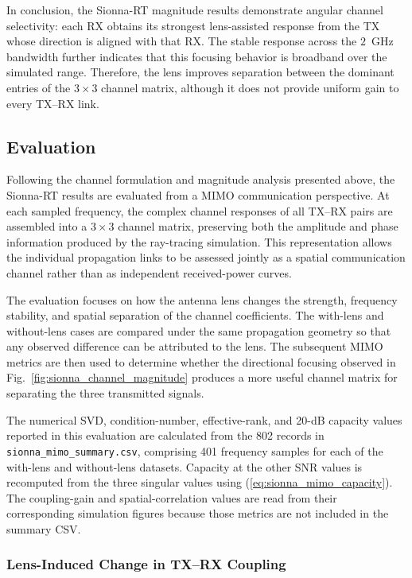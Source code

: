 \documentclass[10pt]{article}
\begin{document}
In conclusion, the Sionna-RT magnitude results demonstrate angular channel
selectivity: each RX obtains its strongest lens-assisted response from the TX
whose direction is aligned with that RX. The stable response across the
$2$~GHz bandwidth further indicates that this focusing behavior is broadband
over the simulated range. Therefore, the lens improves separation between the
dominant entries of the $3\times3$ channel matrix, although it does not provide
uniform gain to every TX--RX link.

\subsection{Evaluation}

Following the channel formulation and magnitude analysis presented above, the
Sionna-RT results are evaluated from a MIMO communication perspective. At each
sampled frequency, the complex channel responses of all TX--RX pairs are
assembled into a $3\times3$ channel matrix, preserving both the amplitude and
phase information produced by the ray-tracing simulation. This representation
allows the individual propagation links to be assessed jointly as a spatial
communication channel rather than as independent received-power curves.

The evaluation focuses on how the antenna lens changes the strength,
frequency stability, and spatial separation of the channel coefficients. The
with-lens and without-lens cases are compared under the same propagation
geometry so that any observed difference can be attributed to the lens. The
subsequent MIMO metrics are then used to determine whether the directional
focusing observed in Fig.~\ref{fig:sionna_channel_magnitude} produces a more
useful channel matrix for separating the three transmitted signals.

The numerical SVD, condition-number, effective-rank, and 20-dB capacity values
reported in this evaluation are calculated from the 802 records in
\texttt{sionna\_mimo\_summary.csv}, comprising 401 frequency samples for each
of the with-lens and without-lens datasets. Capacity at the other SNR values is
recomputed from the three singular values using
(\ref{eq:sionna_mimo_capacity}). The coupling-gain and spatial-correlation
values are read from their corresponding simulation figures because those
metrics are not included in the summary CSV.

\subsubsection{Lens-Induced Change in TX--RX Coupling}
\end{document}
